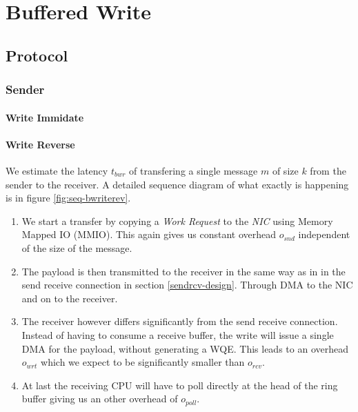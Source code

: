 
\section{Buffered Write}

\subsection{Protocol}
\subsubsection{Sender}
\paragraph{Write Immidate}


\paragraph{Write Reverse}

We estimate the latency $t_{bwr}$ of transfering a single message $m$ of size $k$ from the sender to the receiver. 
A detailed sequence diagram of what exactly is happening is in figure \ref{fig:seq-bwriterev}. 

\begin{enumerate}
  \item We start a transfer by copying a \emph{Work Request} to the \emph{NIC} using Memory Mapped IO (MMIO). This again gives
    us constant overhead $o_{snd}$ independent of the size of the message.
  \item The payload is then transmitted to the receiver in the same way as in in the send receive connection in section 
    \ref{sendrcv-design}. Through DMA to the NIC and on to the receiver.
  \item The receiver however differs significantly from the send receive connection. Instead of having to consume a receive buffer,
    the write will issue a single DMA for the payload, without generating a WQE. This leads to an overhead $o_{wrt}$ which we
    expect to be significantly smaller than $o_{rcv}$.
  \item At last the receiving CPU will have to poll directly at the head of the ring buffer giving us an other overhead of $o_{poll}$.
\end{enumerate}



